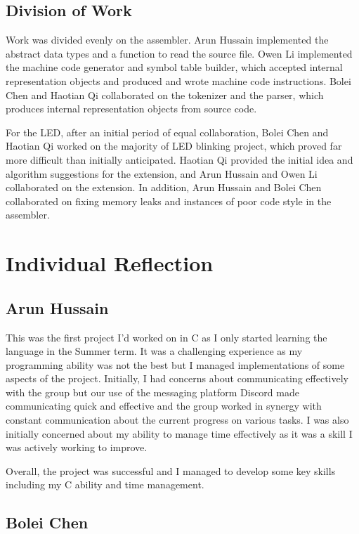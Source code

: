 \documentclass[11pt]{article}
\begin{document}
\subsection{Division of Work}

Work was divided evenly on the assembler. Arun Hussain implemented the abstract data types and a function to read the source file. Owen Li implemented the machine code generator and symbol table builder, which accepted internal representation objects and produced and wrote machine code instructions. Bolei Chen and Haotian Qi collaborated on the tokenizer and the parser, which produces internal representation objects from source code.

For the LED, after an initial period of equal collaboration, Bolei Chen and Haotian Qi worked on the majority of LED blinking project, which proved far more difficult than initially anticipated. Haotian Qi provided the initial idea and algorithm suggestions for the extension, and Arun Hussain and Owen Li collaborated on the extension. In addition, Arun Hussain and Bolei Chen collaborated on fixing memory leaks and instances of poor code style in the assembler.

\section{Individual Reflection}

\subsection{Arun Hussain}

This was the first project I'd worked on in C as I only started learning the language in the Summer term. It was a challenging experience as my programming ability was not the best but I managed implementations of some aspects of the project. Initially, I had concerns about communicating effectively with the group but our use of the messaging platform Discord made communicating quick and effective and the group worked in synergy with constant communication about the current progress on various tasks. I was also initially concerned about my ability to manage time effectively as it was a skill I was actively working to improve.

Overall, the project was successful and I managed to develop some key skills including my C ability and time management.

\subsection{Bolei Chen}
\end{document}
